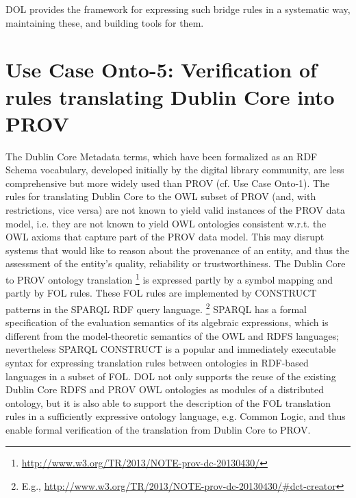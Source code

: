 \documentclass[10pt,%
\ifpretendfinal
final%
\else
draft%
\fi,
]{scrreprt}
\begin{document}
DOL  provides the framework for expressing such bridge rules in a systematic way, maintaining these, and building tools for them. 

\section{Use Case Onto-5: Verification of rules translating Dublin Core into PROV}
The Dublin Core Metadata terms, which have been formalized as an RDF Schema vocabulary, developed initially by the digital library community, are less 
comprehensive but more widely used than PROV (cf. Use Case Onto-1). The rules for translating Dublin Core to the OWL subset of PROV (and, with restrictions, 
vice versa) are not known to yield valid instances of the PROV data model, i.e. they are not known to yield OWL ontologies consistent w.r.t. the OWL axioms that 
capture part of the PROV data model. This may disrupt systems that would like to reason about the provenance of an entity, and thus the assessment of the 
entity's quality, reliability or trustworthiness.
The Dublin Core to PROV ontology translation%
\footnote{\url{http://www.w3.org/TR/2013/NOTE-prov-dc-20130430/}}
  is expressed partly by a symbol mapping and partly by FOL rules. These FOL rules are implemented by CONSTRUCT patterns in the SPARQL RDF query language.%
\footnote{E.g., \url{http://www.w3.org/TR/2013/NOTE-prov-dc-20130430/\#dct-creator}} 
SPARQL has a formal specification of the evaluation semantics of its algebraic expressions, which is different from the model-theoretic semantics of the OWL and RDFS languages; nevertheless SPARQL CONSTRUCT is a popular and immediately executable syntax for expressing translation rules between ontologies in RDF-based languages in a subset of FOL.
DOL  not only supports the reuse of the existing Dublin Core RDFS and PROV OWL ontologies as modules of a distributed ontology, but it is also able to support the description of the FOL translation rules in a sufficiently expressive ontology language, e.g. Common Logic, and thus enable formal verification of the translation from Dublin Core to PROV.
\end{document}
